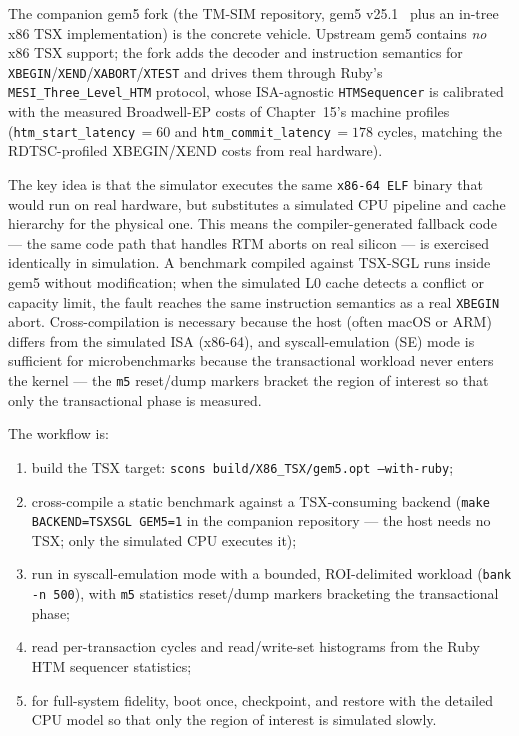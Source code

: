 The companion gem5 fork (the \textsc{TM-SIM} repository, gem5 v25.1~\cite{binkert11gem5} plus an in-tree x86 TSX implementation) is the concrete vehicle. Upstream gem5 contains \emph{no} x86 TSX support; the fork adds the decoder and instruction semantics for \texttt{XBEGIN}/\texttt{XEND}/\texttt{XABORT}/\texttt{XTEST} and drives them through Ruby's \texttt{MESI\_Three\_Level\_HTM} protocol, whose ISA-agnostic \texttt{HTMSequencer} is calibrated with the measured Broadwell-EP costs of Chapter~15's machine profiles (\texttt{htm\_start\_\allowbreak latency}\,\allowbreak${}=60$ and \texttt{htm\_commit\_\allowbreak latency}\,\allowbreak${}=178$ cycles, matching the RDTSC-profiled XBEGIN/XEND costs from real hardware).

The key idea is that the simulator executes the same \texttt{x86-64 ELF} binary that would run on real hardware, but substitutes a simulated CPU pipeline and cache hierarchy for the physical one. This means the compiler-generated fallback code --- the same code path that handles RTM aborts on real silicon --- is exercised identically in simulation. A benchmark compiled against TSX-SGL runs inside gem5 without modification; when the simulated L0 cache detects a conflict or capacity limit, the fault reaches the same instruction semantics as a real \texttt{XBEGIN} abort. Cross-compilation is necessary because the host (often macOS or ARM) differs from the simulated ISA (x86-64), and syscall-emulation (SE) mode is sufficient for microbenchmarks because the transactional workload never enters the kernel --- the \texttt{m5} reset/dump markers bracket the region of interest so that only the transactional phase is measured.

The workflow is:

\begin{enumerate}
    \item build the TSX target: \texttt{scons build/X86\_TSX/gem5.opt --with-ruby};
    \item cross-compile a static benchmark against a TSX-consuming backend (\texttt{make BACKEND=TSXSGL GEM5=1} in the companion repository --- the host needs no TSX; only the simulated CPU executes it);
    \item run in syscall-emulation mode with a bounded, ROI-delimited workload (\texttt{bank -n 500}), with \texttt{m5} statistics reset/dump markers bracketing the transactional phase;
    \item read per-transaction cycles and read/write-set histograms from the Ruby HTM sequencer statistics;
    \item for full-system fidelity, boot once, checkpoint, and restore with the detailed CPU model so that only the region of interest is simulated slowly.
\end{enumerate}

